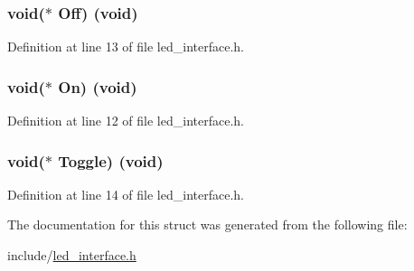 \subsubsection[{\texorpdfstring{Off}{Off}}]{\setlength{\rightskip}{0pt plus 5cm}void($\ast$ Off) (void)}\hypertarget{struct_led_interface_a029a02aac2d90bfb8c8a526af9c6f806}{}\label{struct_led_interface_a029a02aac2d90bfb8c8a526af9c6f806}


Definition at line 13 of file led\+\_\+interface.\+h.

\subsubsection[{\texorpdfstring{On}{On}}]{\setlength{\rightskip}{0pt plus 5cm}void($\ast$ On) (void)}\hypertarget{struct_led_interface_a53489a630b9ad16869554f434da8a204}{}\label{struct_led_interface_a53489a630b9ad16869554f434da8a204}


Definition at line 12 of file led\+\_\+interface.\+h.

\subsubsection[{\texorpdfstring{Toggle}{Toggle}}]{\setlength{\rightskip}{0pt plus 5cm}void($\ast$ Toggle) (void)}\hypertarget{struct_led_interface_a2ab9d217f963a617589e790954897f07}{}\label{struct_led_interface_a2ab9d217f963a617589e790954897f07}


Definition at line 14 of file led\+\_\+interface.\+h.



The documentation for this struct was generated from the following file\+:\begin{DoxyCompactItemize}
\item 
include/\hyperlink{led__interface_8h}{led\+\_\+interface.\+h}\end{DoxyCompactItemize}
